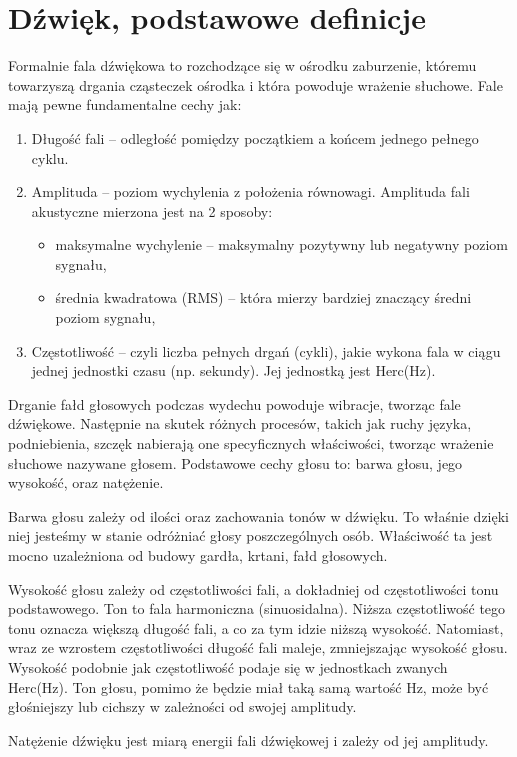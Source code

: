 \documentclass[declaration,shortabstract]{iithesis}
\begin{document}
\section{Dźwięk, podstawowe definicje}
Formalnie fala dźwiękowa to rozchodzące się w ośrodku zaburzenie, któremu towarzyszą drgania cząsteczek ośrodka i która powoduje wrażenie słuchowe.  Fale mają pewne fundamentalne cechy jak:
\begin{enumerate}
\item Długość fali -- odległość pomiędzy początkiem a końcem jednego pełnego cyklu.
\item Amplituda -- poziom wychylenia z położenia równowagi. Amplituda fali akustyczne mierzona jest na 2 sposoby:
	\begin{itemize}
	\item maksymalne wychylenie -- maksymalny pozytywny lub negatywny poziom sygnału,
	\item średnia kwadratowa (RMS) -- która mierzy bardziej znaczący średni poziom sygnału,
	\end{itemize}
\item Częstotliwość -- czyli liczba pełnych drgań (cykli), jakie wykona fala w ciągu jednej jednostki czasu (np. sekundy). Jej jednostką jest Herc(Hz).
\end{enumerate}

Drganie fałd głosowych podczas wydechu powoduje wibracje, tworząc fale dźwiękowe. Następnie na skutek różnych procesów, takich jak ruchy języka, podniebienia, szczęk nabierają one specyficznych właściwości, tworząc wrażenie słuchowe nazywane głosem. Podstawowe cechy głosu to: barwa głosu, jego wysokość, oraz natężenie.

Barwa głosu zależy od ilości oraz zachowania tonów w dźwięku. To właśnie dzięki niej jesteśmy w stanie odróżniać głosy poszczególnych osób. Właściwość ta jest mocno uzależniona od budowy gardła, krtani, fałd głosowych. 

Wysokość głosu zależy od częstotliwości fali, a dokładniej od częstotliwości tonu podstawowego. Ton to fala harmoniczna (sinuosidalna). Niższa częstotliwość tego tonu oznacza większą długość fali, a co za tym idzie niższą wysokość. Natomiast, wraz ze wzrostem częstotliwości długość fali maleje, zmniejszając wysokość głosu. Wysokość podobnie jak częstotliwość podaje się w jednostkach zwanych Herc(Hz). Ton głosu, pomimo że będzie miał taką samą wartość Hz, może być głośniejszy lub cichszy w zależności od swojej amplitudy. 

Natężenie dźwięku jest miarą energii fali dźwiękowej i zależy od jej amplitudy.
\end{document}
